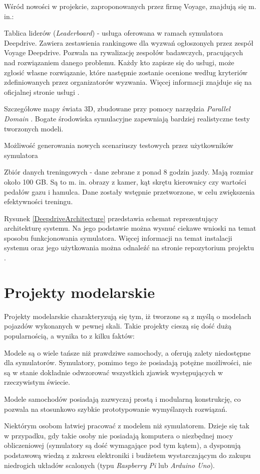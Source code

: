 Wśród nowości w projekcie, zaproponowanych przez firmę Voyage, znajdują się m. in.:
\begin{itemize*}
\item Tablica liderów (\textit{Leaderboard}) - usługa oferowana w ramach symulatora Deepdrive. Zawiera zestawienia rankingowe dla wyzwań ogłoszonych przez zespół Voyage Deepdrive. Pozwala na rywalizację zespołów badawczych, pracujących nad rozwiązaniem danego problemu. Każdy kto zapisze się do usługi, może zgłosić własne rozwiązanie, które następnie zostanie ocenione według kryteriów zdefiniowanych przez organizatorów wyzwania. Więcej informacji znajduje się na oficjalnej stronie usługi \cite{deepdrive:leaderboard}.
\item Szczegółowe mapy świata 3D, zbudowane przy pomocy narzędzia \textit{Parallel Domain} \cite{parallelDomain}. Bogate środowiska symulacyjne zapewniają bardziej realistyczne testy tworzonych modeli.
\item Możliwość generowania nowych scenariuszy testowych przez użytkowników symulatora
\item Zbiór danych treningowych - dane zebrane z ponad 8 godzin jazdy. Mają rozmiar około 100 GB. Są to m. in. obrazy z kamer, kąt skrętu kierownicy czy wartości pedałów gazu i hamulca. Dane zostały wstępnie przetworzone, w celu zwiększenia efektywności treningu.
\end{itemize*}

Rysunek \ref{DeepdriveArchitecture} przedstawia schemat reprezentujący architekturę systemu. Na jego podstawie można wysnuć ciekawe wnioski na temat sposobu funkcjonowania symulatora. Więcej informacji na temat instalacji systemu oraz jego użytkowania można odnaleźć na stronie repozytorium projektu \cite{deepdrive:github}.

\section{Projekty modelarskie}
Projekty modelarskie charakteryzują się tym, iż tworzone są z myślą o modelach pojazdów wykonanych w pewnej skali. Takie projekty cieszą się dość dużą popularnością, a wynika to z kilku faktów:
\begin{enumerate*}
\item Modele są o wiele tańsze niż prawdziwe samochody, a oferują zalety niedostępne dla symulatorów. Symulatory, pomimo tego że posiadają potężne możliwości, nie są w stanie dokładnie odwzorować wszystkich zjawisk występujących w rzeczywistym świecie.
\item Modele samochodów posiadają zazwyczaj prostą i modularną konstrukcję, co pozwala na stosunkowo szybkie prototypowanie wymyślanych rozwiązań.
\item Niektórym osobom łatwiej pracować z modelem niż symulatorem. Dzieje się tak w przypadku, gdy takie osoby nie posiadają komputera o niezbędnej mocy obliczeniowej (symulatory są dość wymagające pod tym kątem), a dysponują podstawową wiedzą z zakresu elektroniki i budżetem wystarczającym do zakupu niedrogich układów scalonych (typu \textit{Raspberry Pi} lub \textit{Arduino Uno}).
\end{enumerate*}

